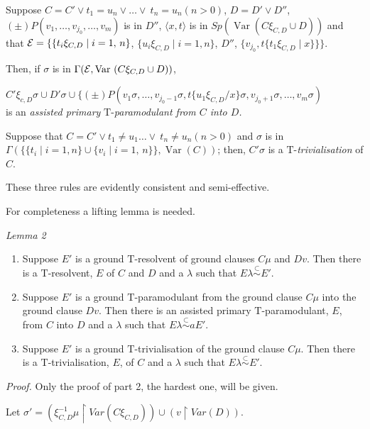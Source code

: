 \documentclass[letterpaper]{report}
\begin{document}
Suppose
$C=C'\lor t_{1}=u_{n}\vee\ldots\lor\ t_{n}=u_{n}(n>0)$,
$D=D'\lor D''$,
$(\pm)P(v_{1}, \ldots, v_{j_{0}}, \ldots, v_{m})$ is in
$D''$, $\langle x, t\rangle$ is in
$Sp(\operatorname{Var}(C\xi_{C,D}\cup D))$ and that
${\cal E}=\{\{t_{i}\xi_{C,D}\mid i=1,\,n\}$,
$\{u_{i}\xi_{C,D}\mid i=1, n\}$, $D''$,
$\{v_{j_{0}}, t\{t_{1}\xi_{C, D}\mid x\}\}\}$.

Then, if $\sigma$ is in
$\Gamma({\cal E}, \operatorname{Var}\,\,(C\xi_{C,D}\cup D))$,

$C'\xi_{c,D}\sigma\cup D'\sigma\cup\{(\pm)P(v_{1}\sigma,\ldots,v_{j_{0}-1}\sigma,t\{u_{1}\xi_{C,D} / x\}\sigma,v_{j_{0}+1}\sigma,\ldots,v_{m}\sigma)$\\
is an \emph{assisted primary} $\mathrm{T}$-\emph{paramodulant from $C$ into $D$.}

Suppose that
$C=C'\lor t_{1}\neq u_{1}\ldots\lor\ t_{n}\neq u_{n}(n>0)$ and
$\sigma$ is in
$\Gamma(\{\{t_{i}\mid i=1,n\}\cup\{v_{i}\mid i=1,\,n\}\},\operatorname{Var}(C))$;
then, $C'\sigma$ is a $\mathrm{T}$-\emph{trivialisation} of $C$.

These three rules are evidently consistent and semi-effective.

For completeness a lifting lemma is needed.

\noindent
\emph{Lemma 2}

\begin{enumerate}
	\def\labelenumi{(\arabic{enumi})}
	\item
	Suppose $E'$ is a ground $\mathrm{T}$-resolvent of ground clauses
	$C\mu$ and $Dv$. Then there is a $\mathrm{T}$-resolvent, $E$ of $C$ and
	$D$ and a $\lambda$ such that $E\lambda \stackrel{{\subset}}{{\sim}} E'$.
	\item
	Suppose $E'$ is a ground $\mathrm{T}$-paramodulant from the ground
	clause $C\mu$ into the ground clause $Dv$. Then there is an
	assisted primary $\mathrm{T}$-paramodulant, $E$, from $C$ into $D$ and a
	$\lambda$ such that $E\lambda \stackrel{{\subset}}{{\sim}}a E'$.
	\item
	Suppose $E'$ is a ground $\mathrm{T}$-trivialisation of the ground
	clause $C\mu$. Then there is a $\mathrm{T}$-trivialisation, $E$, of $C$ and
	a $\lambda$ such that $E\lambda \stackrel{{\subset}}{{\sim}} E'$.
\end{enumerate}

\noindent
\emph{Proof.} Only the proof of part 2, the hardest one, will be given.

Let
$\sigma'=(\xi_{C,D}^{-1}\mu\upharpoonright Var(C\xi_{C,D}))\cup(v \upharpoonright Var(D))$.
\end{document}
